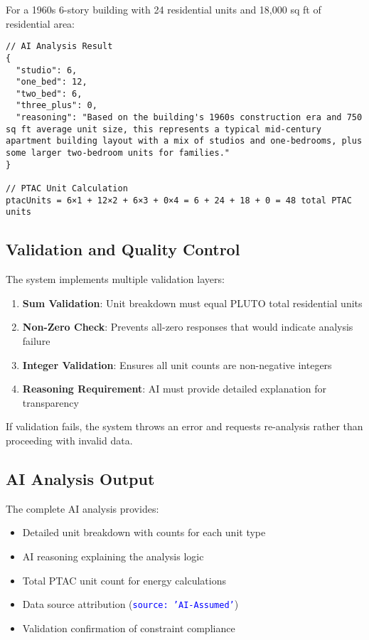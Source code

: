 \documentclass{article}
\newcommand{\code}[1]{\textcolor{blue}{\texttt{#1}}}
\begin{document}
For a 1960s 6-story building with 24 residential units and 18,000 sq ft of residential area:

\begin{lstlisting}
// AI Analysis Result
{
  "studio": 6,
  "one_bed": 12,
  "two_bed": 6, 
  "three_plus": 0,
  "reasoning": "Based on the building's 1960s construction era and 750 sq ft average unit size, this represents a typical mid-century apartment building layout with a mix of studios and one-bedrooms, plus some larger two-bedroom units for families."
}

// PTAC Unit Calculation  
ptacUnits = 6×1 + 12×2 + 6×3 + 0×4 = 6 + 24 + 18 + 0 = 48 total PTAC units
\end{lstlisting}

\subsection{Validation and Quality Control}

The system implements multiple validation layers:

\begin{enumerate}
    \item \textbf{Sum Validation}: Unit breakdown must equal PLUTO total residential units
    \item \textbf{Non-Zero Check}: Prevents all-zero responses that would indicate analysis failure
    \item \textbf{Integer Validation}: Ensures all unit counts are non-negative integers
    \item \textbf{Reasoning Requirement}: AI must provide detailed explanation for transparency
\end{enumerate}

If validation fails, the system throws an error and requests re-analysis rather than proceeding with invalid data.

\subsection{AI Analysis Output}

The complete AI analysis provides:

\begin{itemize}
    \item Detailed unit breakdown with counts for each unit type
    \item AI reasoning explaining the analysis logic
    \item Total PTAC unit count for energy calculations
    \item Data source attribution (\code{source: 'AI-Assumed'})
    \item Validation confirmation of constraint compliance
\end{itemize}
\end{document}
